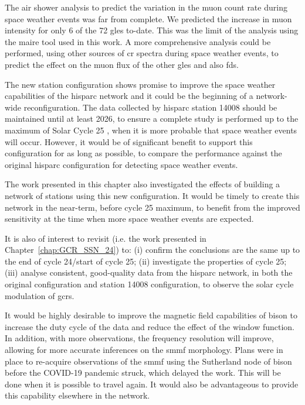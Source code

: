 The air shower analysis to predict the variation in the muon count rate during space weather events was far from complete. We predicted the increase in muon intensity for only 6 of the 72 \glspl{gle} to-date. This was the limit of the analysis using the \gls{maire} tool used in this work. A more comprehensive analysis could be performed, using other sources of \gls{cr} spectra during space weather events, to predict the effect on the muon flux of the other \glspl{gle} and also \glspl{fd}.

The new station configuration shows promise to improve the space weather capabilities of the \gls{hisparc} network and it could be the beginning of a network-wide reconfiguration. The data collected by \gls{hisparc} station 14008 should be maintained until at least 2026, to ensure a complete study is performed up to the maximum of Solar Cycle 25 \citep{mcintosh_overlapping_2020, pesnell_lessons_2020}, when it is more probable that space weather events will occur. However, it would be of significant benefit to support this configuration for as long as possible, to compare the performance against the original \gls{hisparc} configuration for detecting space weather events.

The work presented in this chapter also investigated the effects of building a network of stations using this new configuration. It would be timely to create this network in the near-term, before cycle 25 maximum, to benefit from the improved sensitivity at the time when more space weather events are expected.


\vspace{2em}


It is also of interest to revisit \citet{ross_behaviour_2019} (i.e. the work presented in Chapter~\ref{chap:GCR_SSN_24}) to: (i) confirm the conclusions are the same up to the end of cycle 24/start of cycle 25; (ii) investigate the properties of cycle 25; (iii) analyse consistent, good-quality data from the \gls{hisparc} network, in both the original configuration and station 14008 configuration, to observe the solar cycle modulation of \glspl{gcr}.


\vspace{2em}


It would be highly desirable to improve the magnetic field capabilities of \gls{bison} to increase the duty cycle of the data and reduce the effect of the window function. In addition, with more observations, the frequency resolution will improve, allowing for more accurate inferences on the \gls{smmf} morphology. Plans were in place to re-acquire observations of the \gls{smmf} using the Sutherland node of \gls{bison} before the COVID-19 pandemic struck, which delayed the work. This will be done when it is possible to travel again. It would also be advantageous to provide this capability elsewhere in the network.

